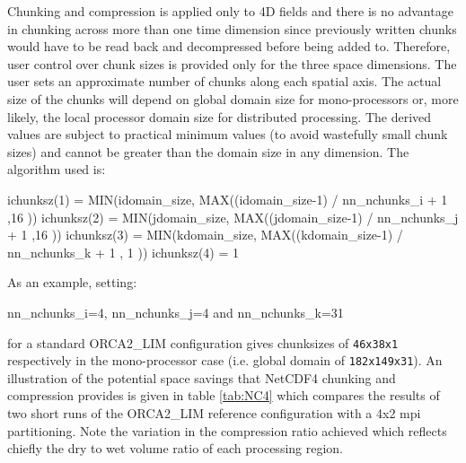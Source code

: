 \documentclass[../tex_main/NEMO_manual]{subfiles}
\begin{document}
Chunking and compression is applied only to 4D fields and there is no advantage in 
chunking across more than one time dimension since previously written chunks would have to 
be read back and decompressed before being added to.
Therefore, user control over chunk sizes is provided only for the three space dimensions.
The user sets an approximate number of chunks along each spatial axis.
The actual size of the chunks will depend on global domain size for mono-processors or, 
more likely, the local processor domain size for distributed processing.
The derived values are subject to practical minimum values (to avoid wastefully small chunk sizes) and 
cannot be greater than the domain size in any dimension.
The algorithm used is:

\begin{forlines}
ichunksz(1) = MIN(idomain_size, MAX((idomain_size-1) / nn_nchunks_i + 1 ,16 ))
ichunksz(2) = MIN(jdomain_size, MAX((jdomain_size-1) / nn_nchunks_j + 1 ,16 ))
ichunksz(3) = MIN(kdomain_size, MAX((kdomain_size-1) / nn_nchunks_k + 1 , 1 ))
ichunksz(4) = 1
\end{forlines}

\noindent As an example, setting:

\begin{forlines}
nn_nchunks_i=4, nn_nchunks_j=4 and nn_nchunks_k=31
\end{forlines}

\noindent for a standard ORCA2\_LIM configuration gives chunksizes of {\small\tt 46x38x1} respectively in 
the mono-processor case (i.e. global domain of {\small\tt 182x149x31}).
An illustration of the potential space savings that NetCDF4 chunking and compression provides is given in 
table \autoref{tab:NC4} which compares the results of two short runs of 
the ORCA2\_LIM reference configuration with a 4x2 mpi partitioning.
Note the variation in the compression ratio achieved which reflects chiefly the dry to 
wet volume ratio of each processing region.
\end{document}
